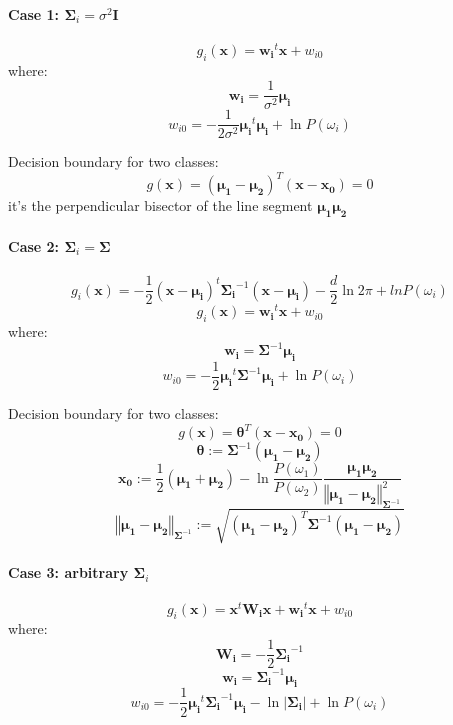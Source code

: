 \documentclass{article}
\begin{document}
\begin{multicols}{2}
\paragraph{Case 1: $\symbf{\Sigma}_i = \sigma^2 \symbf{I}$}
\[g_i(\symbf{x}) = \symbf{w_i}^t \symbf{x} + w_{i0}\]
where:
\[\symbf{w_i} = \frac{1}{\sigma^{2}} \symbf{\mu_i}\]
\[w_{i0} = -\frac{1}{2\sigma^2}\symbf{\mu_i}^t \symbf{\mu_i} + \ln P(\omega_i) \]

Decision boundary for two classes:
\[g(\symbf{x}) = (\symbf{\mu_1} - \symbf{\mu_2})^T (\symbf{x} - \symbf{x_0}) = 0\]
it's the perpendicular bisector of the line segment $\symbf{\mu_1} \symbf{\mu_2}$

\paragraph{Case 2: $\symbf{\Sigma}_i = \symbf{\Sigma}$}
\[g_i(\symbf{x}) = -\frac{1}{2} (\symbf{x} - \symbf{\mu_i})^t \symbf{\Sigma_i}^{-1} (\symbf{x} - \symbf{\mu_i}) - \frac{d}{2}\ln2\pi + ln P(\omega_i)\]
\[g_i(\symbf{x}) = \symbf{w_i}^t \symbf{x} + w_{i0}\]
where:
\[\symbf{w_i} = \symbf{\Sigma}^{-1} \symbf{\mu_i}\]
\[w_{i0} = -\frac{1}{2}\symbf{\mu_i}^t \symbf{\Sigma}^{-1} \symbf{\mu_i} + \ln P(\omega_i) \]

Decision boundary for two classes:
\[g(\symbf{x}) = \symbf{\theta}^T (\symbf{x} - \symbf{x_0}) = 0\]
\[\symbf{\theta} := \symbf{\Sigma}^{-1} (\symbf{\mu_1} - \symbf{\mu_2})\]
\[\symbf{x_0} := \frac{1}{2} (\symbf{\mu_1} + \symbf{\mu_2}) - \ln \frac{P(\omega_1)}{P(\omega_2)} \frac{\symbf{\mu_1} \symbf{\mu_2}}{\left\Vert \symbf{\mu_1} - \symbf{\mu_2} \right\Vert_{\symbf{\Sigma}^{-1}}^2}\]
\[\left\Vert \symbf{\mu_1} - \symbf{\mu_2} \right\Vert_{\symbf{\Sigma}^{-1}} := \sqrt{(\symbf{\mu_1} - \symbf{\mu_2})^T \symbf{\Sigma}^{-1} (\symbf{\mu_1} - \symbf{\mu_2})}\]

\paragraph{Case 3: arbitrary $\symbf{\Sigma}_i$}
\[g_i(\symbf{x}) = \symbf{x}^t \symbf{W_i} \symbf{x} + \symbf{w_i}^t \symbf{x} + w_{i0}\]
where:
\[\symbf{W_i} = -\frac{1}{2}\symbf{\Sigma_i}^{-1}\]
\[\symbf{w_i} = \symbf{\Sigma_i}^{-1} \symbf{\mu_i}\]
\[w_{i0} = -\frac{1}{2}\symbf{\mu_i}^t \symbf{\Sigma_i}^{-1} \symbf{\mu_i} - \ln |\symbf{\Sigma_i}| + \ln P(\omega_i) \]


\end{multicols}
\end{document}
